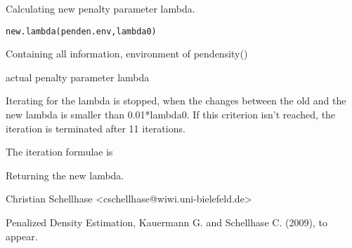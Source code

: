 \begin{Description}\relax
Calculating new penalty parameter lambda.
\end{Description}
\begin{Usage}
\begin{verbatim}
new.lambda(penden.env,lambda0)
\end{verbatim}
\end{Usage}
\begin{Arguments}
\begin{ldescription}
\item[\code{penden.env}] Containing all information, environment of pendensity()
\item[\code{lambda0}] actual penalty parameter lambda
\end{ldescription}
\end{Arguments}
\begin{Details}\relax
Iterating for the lambda is stopped, when the changes between the old and the new lambda is smaller than 0.01*lambda0. If this criterion isn't reached, the iteration is terminated after 11 iterations.

The iteration formulae is
\end{Details}
\begin{Value}
Returning the new lambda.
\end{Value}
\begin{Author}\relax
Christian Schellhase <cschellhase@wiwi.uni-bielefeld.de>
\end{Author}
\begin{References}\relax
Penalized Density Estimation, Kauermann G. and Schellhase C. (2009), to appear.
\end{References}

